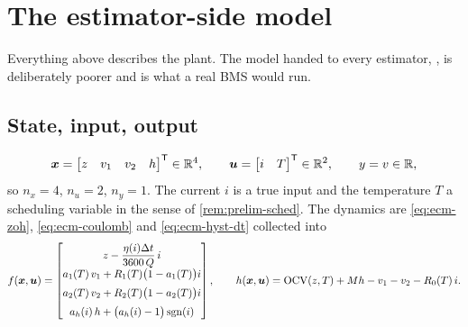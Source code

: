\section{The estimator-side model}
\label{sec:ecm-estimator}

Everything above describes the plant. The model handed to every estimator, , is
deliberately poorer and is what a real BMS would run.

\subsection{State, input, output}
\begin{equation}
\bm{x} = \begin{bmatrix}z & v_1 & v_2 & h\end{bmatrix}^{\mathsf{T}} \in \mathbb{R}^4, \qquad
\bm{u} = \begin{bmatrix}i & T\end{bmatrix}^{\mathsf{T}}\in\mathbb{R}^2, \qquad
y = v \in \mathbb{R},
\label{eq:ecm-state}
\end{equation}
so $n_x=4$, $n_u=2$, $n_y=1$. The current $i$ is a true input and the temperature $T$ a
scheduling variable in the sense of \cref{rem:prelim-sched}. The dynamics are
\eqref{eq:ecm-zoh}, \eqref{eq:ecm-coulomb} and \eqref{eq:ecm-hyst-dt} collected into
\begin{equation}
f(\bm{x},\bm{u}) = \begin{bmatrix}
 z - \dfrac{\eta(i)\Delta t}{3600\,Q}\,i \\[2mm]
 a_1(T)\,v_1 + R_1(T)\big(1-a_1(T)\big) i \\[2mm]
 a_2(T)\,v_2 + R_2(T)\big(1-a_2(T)\big) i \\[2mm]
 a_h(i)\,h + \big(a_h(i)-1\big)\operatorname{sgn}(i)
\end{bmatrix},
\qquad
h(\bm{x},\bm{u}) = \mathrm{OCV}(z,T) + M h - v_1 - v_2 - R_0(T)\,i .
\label{eq:ecm-fh}
\end{equation}

